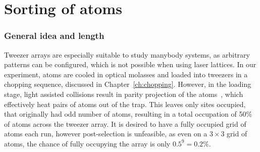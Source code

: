 \chapter{Sorting of atoms}%
\label{sec:sorting}

\subsection*{General idea and length}


Tweezer arrays are especially suitable to study manybody systems, as arbitrary patterns can be configured, which is not possible when using laser lattices. In our experiment, atoms are cooled in optical molasses and loaded into tweezers in a chopping sequence, discussed in Chapter~\ref{ch:chopping}. However, in the loading stage, light assisted collisions result in parity projection of the atoms~\cite{Cooper2018}, which effectively heat pairs of atoms out of the trap. This leaves only sites occupied, that originally had odd number of atoms, resulting in a total occupation of 50\% of atoms across the tweezer array. It is desired to have a fully occupied grid of atoms each run, however post-selection is unfeasible, as even on a $3\times3$ grid of atoms, the chance of fully occupying the array is only $0.5^9 = 0.2\%$.

